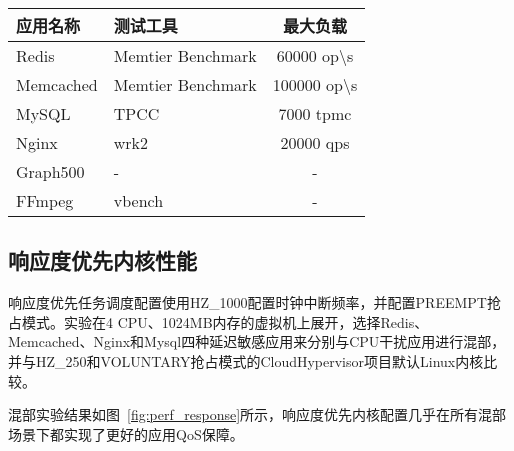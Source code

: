 \begin{table}[H]
    \label{tab:app_work}
    \footnotesize%
    \setlength{\tabcolsep}{8pt}%
    \renewcommand{\arraystretch}{1.25}%
    \centering
    \begin{tabular}{llc}
        \hline
        应用名称 & 测试工具 & 最大负载 \\
        \hline
        Redis     & Memtier Benchmark & 60000 op\textbackslash s \\
        Memcached & Memtier Benchmark & 100000 op\textbackslash s \\
        MySQL     & TPCC              & 7000  tpmc \\
        Nginx     & wrk2              & 20000 qps \\
        Graph500  & -                 & - \\
        FFmpeg    & vbench            & - \\
        \hline
    \end{tabular}
\end{table}

\subsection{响应度优先内核性能}

响应度优先任务调度配置使用HZ\_1000配置时钟中断频率，并配置PREEMPT抢占模式。实验在4 CPU、1024MB内存的虚拟机上展开，选择Redis、Memcached、Nginx和Mysql四种延迟敏感应用来分别与CPU干扰应用进行混部，并与HZ\_250和VOLUNTARY抢占模式的CloudHypervisor项目默认Linux内核比较。

混部实验结果如图~\ref{fig:perf_response}所示，响应度优先内核配置几乎在所有混部场景下都实现了更好的应用QoS保障。

